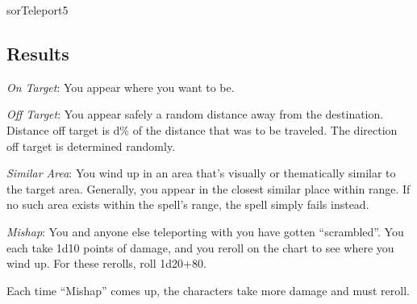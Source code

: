 \begin{spellcard}{sor}{Teleport}{5}
  \subsection*{Results}
  \emph{On Target}: You appear where you want to be.

  \emph{Off Target}: You appear safely a random distance away from the destination.
  Distance off target is d\% of the distance that was to be traveled.
  The direction off target is determined randomly.

  \emph{Similar Area}: You wind up in an area that's visually or thematically similar to the target area.
  Generally, you appear in the closest similar place within range.
  If no such area exists within the spell's range, the spell simply fails instead.

  \emph{Mishap}: You and anyone else teleporting with you have gotten ``scrambled''.
  You each take 1d10 points of damage, and you reroll on the chart to see where you wind up.
  For these rerolls, roll 1d20+80.

  Each time ``Mishap'' comes up, the characters take more damage and must reroll.
\end{spellcard}
